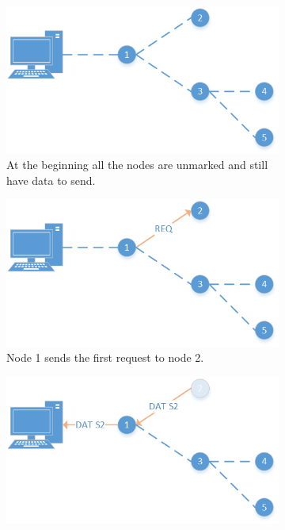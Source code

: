 \begin{figure}[htbp]
 
	\vspace*{-2mm}

	\centering
	\begin{subfigure}[t]{0.4\textwidth}
		\centering
    		\includegraphics[scale=0.6]{content/images/Collection/Part0}
   	 	\caption{At the beginning all the nodes are unmarked and still have data to send.}
    	\label{fig:coll0}
    \end{subfigure}
    \quad
    \quad	
	\begin{subfigure}[t]{0.4\textwidth}
		\centering
    		\includegraphics[scale=0.6]{content/images/Collection/Part1}
   	 	\caption{Node 1 sends the first request to node 2.}
    	\label{fig:coll1}
    \end{subfigure}
    \quad
    \quad
    \begin{subfigure}[t]{0.4\textwidth}
		\centering         
        \includegraphics[scale=0.6]{content/images/Collection/Part2}

\end{subfigure}
\end{figure}
